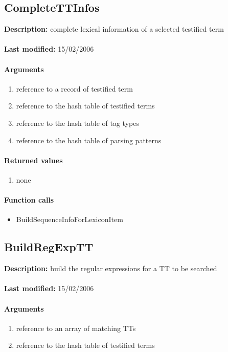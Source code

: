 \subsection{CompleteTTInfos}
\textbf{Description:} complete lexical information of a selected testified term\\
\\\textbf{Last modified:} 15/02/2006

\paragraph{Arguments}
\begin{enumerate}
\item reference to a record of testified term
\item reference to the hash table of testified terms
\item reference to the hash table of tag types
\item reference to the hash table of parsing patterns
\end{enumerate}

\paragraph{Returned values}
\begin{enumerate}
\item none
\end{enumerate}

\paragraph{Function calls}
\begin{itemize}
\item BuildSequenceInfoForLexiconItem
\end{itemize}

\subsection{BuildRegExpTT}
\textbf{Description:} build the regular expressions for a TT to be searched\\
\\\textbf{Last modified:} 15/02/2006

\paragraph{Arguments}
\begin{enumerate}
\item reference to an array of matching TTs
\item reference to the hash table of testified terms
\end{enumerate}

